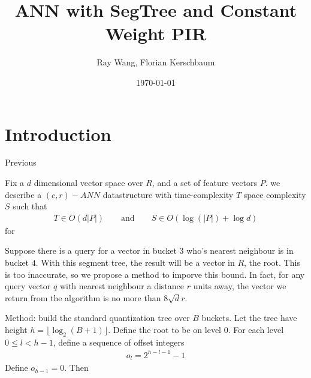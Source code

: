 \documentclass[a4paper, 12pt]{article}
\title{ANN with SegTree and Constant Weight PIR}
\author{Ray Wang, Florian Kerschbaum}
\date{\today}
\begin{document}
\maketitle %
\newpage

\section{Introduction}
Previous 

Fix a \(d\) dimensional vector space over \(R\), and a set of feature vectors \(P\). 
we describe a \((c,r)-ANN\) datastructure with time-complexity \(T\)
space complexity \(S\) such that 
\begin{align*}
  T \in O(d|P|) \qquad \text{and} \qquad S \in O(\log(|P|) + \log{d})
\end{align*}
for 

\begin{center}
\end{center}
Suppose there is a query for a vector in bucket \(3\) 
who's nearest neighbour is in bucket \(4\). 
With this segment tree, the result will be a vector in \(R\), the root.
This is too inaccurate, so we propose a method to imporve this bound. 
In fact, for any query vector \(q\) with nearest neighbour a distance \(r\) units away,
the vector we return from the algorithm is no more than \(8\sqrt{d}r\). 

Method: build the standard quantization tree over \(B\) buckets. 
Let the tree have height \(h = \lfloor \log_2(B+1)\rfloor \).
Define the root to be on level \(0\). 
For each level \(0 \leq l < h-1 \), define a sequence of offset integers 
\begin{align*}
  o_{l} = 2^{h-l-1}-1 
\end{align*}
Define \(o_{h-1} = 0 \). Then 
\end{document}
